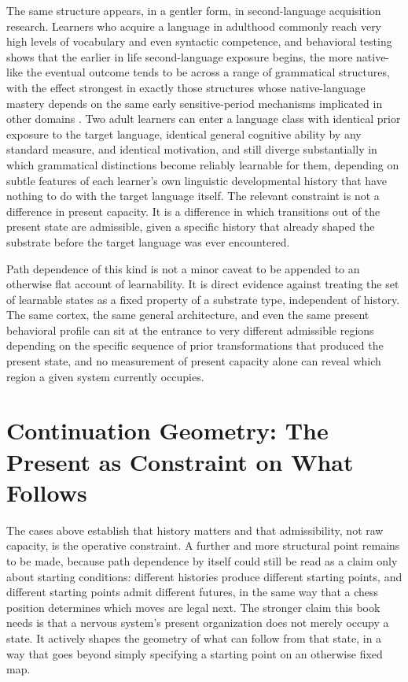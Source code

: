 \documentclass[11pt]{book}
\begin{document}
The same structure appears, in a gentler form, in second-language acquisition research. Learners who acquire a language in adulthood commonly reach very high levels of vocabulary and even syntactic competence, and behavioral testing shows that the earlier in life second-language exposure begins, the more native-like the eventual outcome tends to be across a range of grammatical structures, with the effect strongest in exactly those structures whose native-language mastery depends on the same early sensitive-period mechanisms implicated in other domains \cite{newport1990}. Two adult learners can enter a language class with identical prior exposure to the target language, identical general cognitive ability by any standard measure, and identical motivation, and still diverge substantially in which grammatical distinctions become reliably learnable for them, depending on subtle features of each learner's own linguistic developmental history that have nothing to do with the target language itself. The relevant constraint is not a difference in present capacity. It is a difference in which transitions out of the present state are admissible, given a specific history that already shaped the substrate before the target language was ever encountered.

Path dependence of this kind is not a minor caveat to be appended to an otherwise flat account of learnability. It is direct evidence against treating the set of learnable states as a fixed property of a substrate type, independent of history. The same cortex, the same general architecture, and even the same present behavioral profile can sit at the entrance to very different admissible regions depending on the specific sequence of prior transformations that produced the present state, and no measurement of present capacity alone can reveal which region a given system currently occupies.

\section{Continuation Geometry: The Present as Constraint on What Follows}

The cases above establish that history matters and that admissibility, not raw capacity, is the operative constraint. A further and more structural point remains to be made, because path dependence by itself could still be read as a claim only about starting conditions: different histories produce different starting points, and different starting points admit different futures, in the same way that a chess position determines which moves are legal next. The stronger claim this book needs is that a nervous system's present organization does not merely occupy a state. It actively shapes the geometry of what can follow from that state, in a way that goes beyond simply specifying a starting point on an otherwise fixed map.
\end{document}
